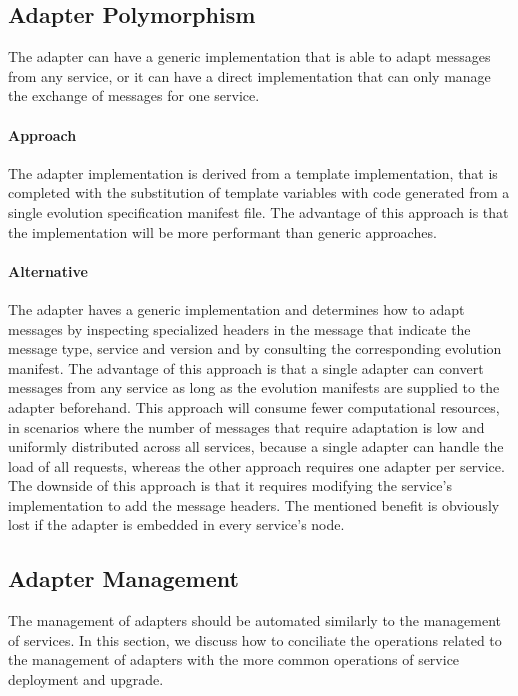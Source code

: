 \subsection{Adapter Polymorphism} %
\label{sec:adapter_polymorphism}

The adapter can have a generic implementation that is able to adapt messages from any service, or it can
have a direct implementation that can only manage the exchange of messages for one service.

\paragraph{Approach}
The adapter implementation is derived from a template implementation,
that is completed with the substitution of template variables with code generated from a single evolution specification manifest file.
The advantage of this approach is that the implementation will be more performant than generic approaches.

\paragraph{Alternative}
The adapter haves a generic implementation and determines how to adapt messages by inspecting specialized headers in the
message that indicate the message type, service and version and by consulting the corresponding evolution manifest.
The advantage of this approach is that a single adapter can convert messages from any service as long as the evolution manifests are supplied to the adapter beforehand.
This approach will consume fewer computational resources, in scenarios where the number of messages that require adaptation is low and uniformly distributed across all services,
because a single adapter can handle the load of all requests, whereas the other approach requires one adapter per service.
The downside of this approach is that it requires modifying the service's implementation to add the message headers.
The mentioned benefit is obviously lost if the adapter is embedded in every service's node.

\subsection{Adapter Management} %
\label{sec:adapter_management}

The management of adapters should be automated similarly to the management of services.
In this section, we discuss how to conciliate the operations related to the management of adapters with the more common operations of service deployment and upgrade.

